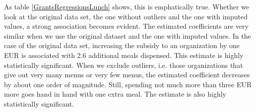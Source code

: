 \documentclass[12pt, a4paper, titlepage]{article}\usepackage[]{graphicx}\usepackage[]{color}
\begin{document}
As table \ref{GrantsRegressionsLunch} shows, this is emphatically true. Whether we look at the original data set, the one without outliers and the one with imputed values, a strong association becomes evident. 
The estimated coefficients are very similar when we use the original dataset and the one with imputed values. In the case of the original data set, increasing the subsidy to an organization by one EUR is associated with 2.6 additional meals dispensed. This estimate is highly statistically significant. When we exclude outliers, i.e. those organizations that give out very many menus or very few menus,
the estimated coefficient decreases by about one order of magnitude. Still, spending not much more than three EUR more goes hand in hand with one extra meal. The estimate is also highly statistically significant.  


\usepackage{booktabs}
\end{document}
